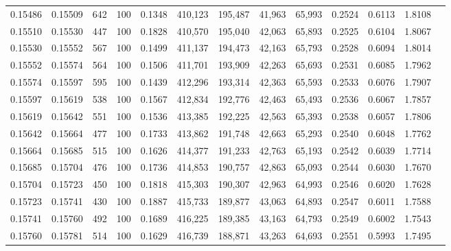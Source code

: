 \begin{tabular}{rrrrrrrrrrrrr}
0.15486 & 0.15509 &   642 & 100 &                                     0.1348 & 410,123 & 195,487 &  41,963 &  65,993 & 0.2524 & 0.6113 & 1.8108 \\
0.15510 & 0.15530 &   447 & 100 &                                     0.1828 & 410,570 & 195,040 &  42,063 &  65,893 & 0.2525 & 0.6104 & 1.8067 \\
0.15530 & 0.15552 &   567 & 100 &                                     0.1499 & 411,137 & 194,473 &  42,163 &  65,793 & 0.2528 & 0.6094 & 1.8014 \\
0.15552 & 0.15574 &   564 & 100 &                                     0.1506 & 411,701 & 193,909 &  42,263 &  65,693 & 0.2531 & 0.6085 & 1.7962 \\
0.15574 & 0.15597 &   595 & 100 &                                     0.1439 & 412,296 & 193,314 &  42,363 &  65,593 & 0.2533 & 0.6076 & 1.7907 \\
0.15597 & 0.15619 &   538 & 100 &                                     0.1567 & 412,834 & 192,776 &  42,463 &  65,493 & 0.2536 & 0.6067 & 1.7857 \\
0.15619 & 0.15642 &   551 & 100 &                                     0.1536 & 413,385 & 192,225 &  42,563 &  65,393 & 0.2538 & 0.6057 & 1.7806 \\
0.15642 & 0.15664 &   477 & 100 &                                     0.1733 & 413,862 & 191,748 &  42,663 &  65,293 & 0.2540 & 0.6048 & 1.7762 \\
0.15664 & 0.15685 &   515 & 100 &                                     0.1626 & 414,377 & 191,233 &  42,763 &  65,193 & 0.2542 & 0.6039 & 1.7714 \\
0.15685 & 0.15704 &   476 & 100 &                                     0.1736 & 414,853 & 190,757 &  42,863 &  65,093 & 0.2544 & 0.6030 & 1.7670 \\
0.15704 & 0.15723 &   450 & 100 &                                     0.1818 & 415,303 & 190,307 &  42,963 &  64,993 & 0.2546 & 0.6020 & 1.7628 \\
0.15723 & 0.15741 &   430 & 100 &                                     0.1887 & 415,733 & 189,877 &  43,063 &  64,893 & 0.2547 & 0.6011 & 1.7588 \\
0.15741 & 0.15760 &   492 & 100 &                                     0.1689 & 416,225 & 189,385 &  43,163 &  64,793 & 0.2549 & 0.6002 & 1.7543 \\
0.15760 & 0.15781 &   514 & 100 &                                     0.1629 & 416,739 & 188,871 &  43,263 &  64,693 & 0.2551 & 0.5993 & 1.7495 \\

\end{tabular}
